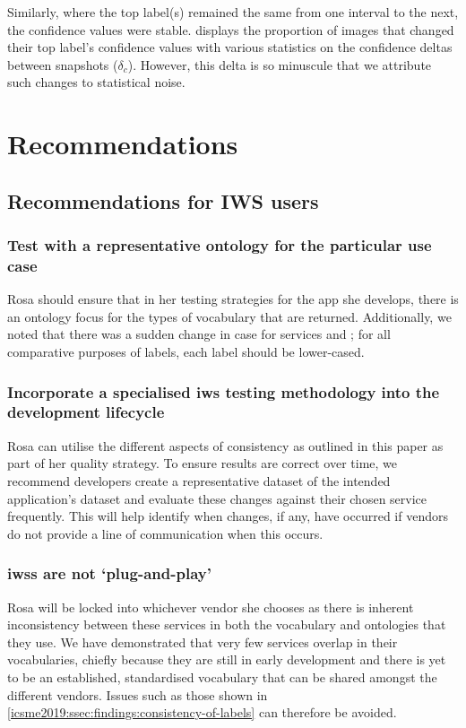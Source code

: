 Similarly, where the top label(s) remained the same from one interval to the next, the confidence values were stable.  displays the proportion of images that changed their top label's confidence values with various statistics on the confidence deltas between snapshots ($\delta_{c}$). However, this delta is so minuscule that we attribute such changes to statistical noise.

\section{Recommendations}
\label{icsme2019:sec:recommendations}

\subsection{Recommendations for IWS users}

\subsubsection{Test with a representative ontology for the particular use case}
Rosa should ensure that in her testing strategies for the app she develops, there is an ontology focus for the types of vocabulary that are returned. Additionally, we noted that there was a sudden change in case for services \googleapi{} and \awsapi{}; for all comparative purposes of labels, each label should be lower-cased. 

\subsubsection[Incorporate a specialised IWS testing methodology into the development lifecycle]{Incorporate a specialised \gls{iws} testing methodology into the development lifecycle}
Rosa can utilise the different aspects of consistency as outlined in this paper as part of her quality strategy. To ensure results are correct over time, we recommend developers create a representative dataset of the intended application's dataset and evaluate these changes against their chosen service frequently. This will help identify when changes, if any, have occurred if vendors do not provide a line of communication when this occurs.

\subsubsection[IWSs are not `plug-and-play']{\glspl{iws} are not `plug-and-play'}
Rosa will be locked into whichever vendor she chooses as there is inherent inconsistency between these services in both the vocabulary and ontologies that they use. We have demonstrated that very few services overlap in their vocabularies, chiefly because they are still in early development and there is yet to be an established, standardised vocabulary that can be shared amongst the different vendors.
 Issues such as those shown in \cref{icsme2019:ssec:findings:consistency-of-labels} can therefore be avoided.
 
